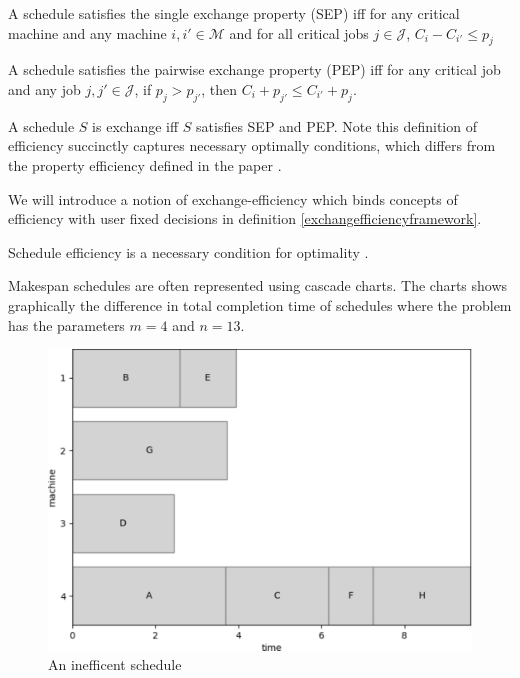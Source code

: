\begin{definition}
	\label{sep}
	
	A schedule satisfies the single exchange property (SEP) iff for any critical machine and any machine $i,i'\in\mathcal{M}$ and for all critical jobs $j\in\mathcal{J}$, $C_i-C_{i'}\leq p_j$
\end{definition}

\begin{definition}
	\label{pep}
	
	A schedule satisfies the pairwise exchange property (PEP) iff for any critical job and any job $j,j'\in\mathcal{J}$, if $p_j>p_{j'}$, then $C_i+p_{j'}\leq C_{i'}+p_j$.
\end{definition}

\begin{definition}
	A schedule $S$ is exchange iff $S$ satisfies SEP and PEP. Note this definition of efficiency succinctly captures necessary optimally conditions, which differs from the property efficiency defined in the paper \cite{aes}.
\end{definition}

We will introduce a notion of exchange-efficiency which binds concepts of efficiency with user fixed decisions in definition \ref{exchangefficiencyframework}.

\begin{proposition}
	Schedule efficiency is a necessary condition for optimality \cite{aes}.
\end{proposition}

Makespan schedules are often represented using cascade charts. The charts shows graphically the difference in total completion time of schedules where the problem has the parameters $m=4$ and $n=13$.

\begin{figure}[H]
	\begin{center}
		\includegraphics[width=.8\linewidth]{figures/makespan_inefficient.pdf}
	\end{center}
	\caption{An inefficent schedule}
\end{figure}


